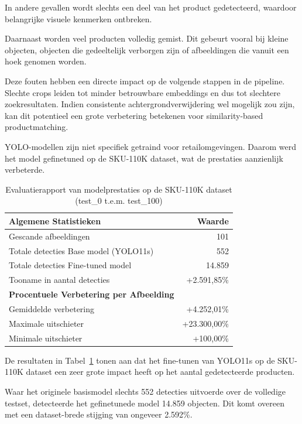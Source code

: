 In andere gevallen wordt slechts een deel van het product gedetecteerd, waardoor belangrijke visuele kenmerken ontbreken.

Daarnaast worden veel producten volledig gemist. Dit gebeurt vooral bij kleine objecten, objecten die gedeeltelijk verborgen zijn of afbeeldingen die vanuit een hoek genomen worden.

Deze fouten hebben een directe impact op de volgende stappen in de pipeline. Slechte crops leiden tot minder betrouwbare embeddings en dus tot slechtere zoekresultaten. Indien consistente achtergrondverwijdering wel mogelijk zou zijn, kan dit potentieel een grote verbetering betekenen voor similarity-based productmatching.

YOLO-modellen zijn niet specifiek getraind voor retailomgevingen. Daarom werd het model gefinetuned op de SKU-110K dataset, wat de prestaties aanzienlijk verbeterde.

\begin{table}[H]
\centering
\caption{Evaluatierapport van modelprestaties op de SKU-110K dataset (test\_0 t.e.m. test\_100)}
\label{tab:evaluatie_yolo}
\begin{tabular}{lr}
\toprule
\textbf{Algemene Statistieken} & \textbf{Waarde} \\
\midrule
Gescande afbeeldingen & 101 \\
Totale detecties Base model (YOLO11s) & 552 \\
Totale detecties Fine-tuned model & 14.859 \\
Tooname in aantal detecties & +2.591,85\% \\
\midrule
\textbf{Procentuele Verbetering per Afbeelding} & \\
\midrule
Gemiddelde verbetering & +4.252,01\% \\
Maximale uitschieter & +23.300,00\% \\
Minimale uitschieter & +100,00\% \\
\bottomrule
\end{tabular}
\end{table}

De resultaten in Tabel~\ref{tab:evaluatie_yolo} tonen aan dat het fine-tunen van YOLO11s op de SKU-110K dataset een zeer grote impact heeft op het aantal gedetecteerde producten. 

Waar het originele basismodel slechts 552 detecties uitvoerde over de volledige testset, detecteerde het gefinetunede model 14.859 objecten. Dit komt overeen met een dataset-brede stijging van ongeveer 2.592\%.

